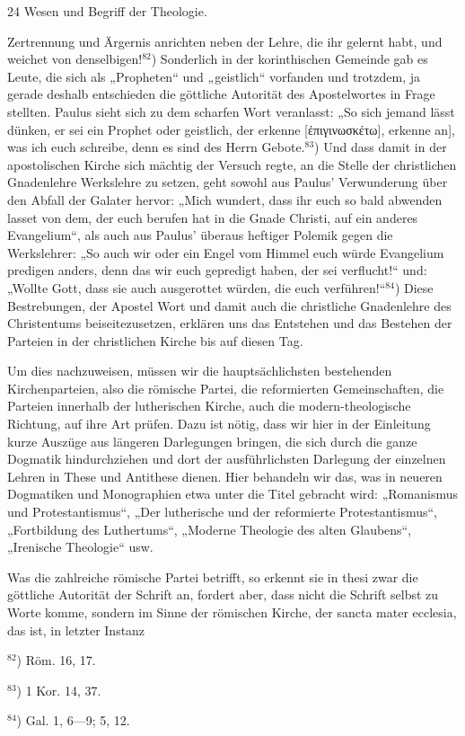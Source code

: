 24 \hspace{\fill} Wesen und Begriff der Theologie.\par\noindent Zertrennung und Ärgernis anrichten neben der Lehre, die ihr gelernt habt, und weichet von denselbigen!$^{82}$) Sonderlich in der korinthischen Gemeinde gab es Leute, die sich als „Propheten“ und „geistlich“ vorfanden und trotzdem, ja gerade deshalb entschieden die göttliche Autorität des Apostelwortes in Frage stellten. Paulus sieht sich zu dem scharfen Wort veranlasst: „So sich jemand lässt dünken, er sei ein Prophet oder geistlich, der erkenne [\textgreek{ἐπιγινωσκέτω}], erkenne an], was ich euch schreibe, denn es sind des Herrn Gebote.$^{83}$) Und dass damit in der apostolischen Kirche sich mächtig der Versuch regte, an die Stelle der christlichen Gnadenlehre Werkslehre zu setzen, geht sowohl aus Paulus' Verwunderung über den Abfall der Galater hervor: „Mich wundert, dass ihr euch so bald abwenden lasset von dem, der euch berufen hat in die Gnade Christi, auf ein anderes Evangelium“, als auch aus Paulus' überaus heftiger Polemik gegen die Werkslehrer: „So auch wir oder ein Engel vom Himmel euch würde Evangelium predigen anders, denn das wir euch gepredigt haben, der sei verflucht!“ und: „Wollte Gott, dass sie auch ausgerottet würden, die euch verführen!“$^{84}$) Diese Bestrebungen, der Apostel Wort und damit auch die christliche Gnadenlehre des Christentums beiseitezusetzen, erklären uns das Entstehen und das Bestehen der Parteien in der christlichen Kirche bis auf diesen Tag.\par Um dies nachzuweisen, müssen wir die hauptsächlichsten bestehenden Kirchenparteien, also die römische Partei, die reformierten Gemeinschaften, die Parteien innerhalb der lutherischen Kirche, auch die modern-theologische Richtung, auf ihre Art prüfen. Dazu ist nötig, dass wir hier in der Einleitung kurze Auszüge aus längeren Darlegungen bringen, die sich durch die ganze Dogmatik hindurchziehen und dort der ausführlichsten Darlegung der einzelnen Lehren in These und Antithese dienen. Hier behandeln wir das, was in neueren Dogmatiken und Monographien etwa unter die Titel gebracht wird: „Romanismus und Protestantismus“, „Der lutherische und der reformierte Protestantismus“, „Fortbildung des Luthertums“, „Moderne Theologie des alten Glaubens“, „Irenische Theologie“ usw.\par Was die zahlreiche römische Partei betrifft, so erkennt sie in thesi zwar die göttliche Autorität der Schrift an, fordert aber, dass nicht die Schrift selbst zu Worte komme, sondern im Sinne der römischen Kirche, der sancta mater ecclesia, das ist, in letzter Instanz\par\vspace{1em}\noindent$^{82}$) Röm. 16, 17.\par$^{83}$) 1 Kor. 14, 37.\par$^{84}$) Gal. 1, 6—9; 5, 12.